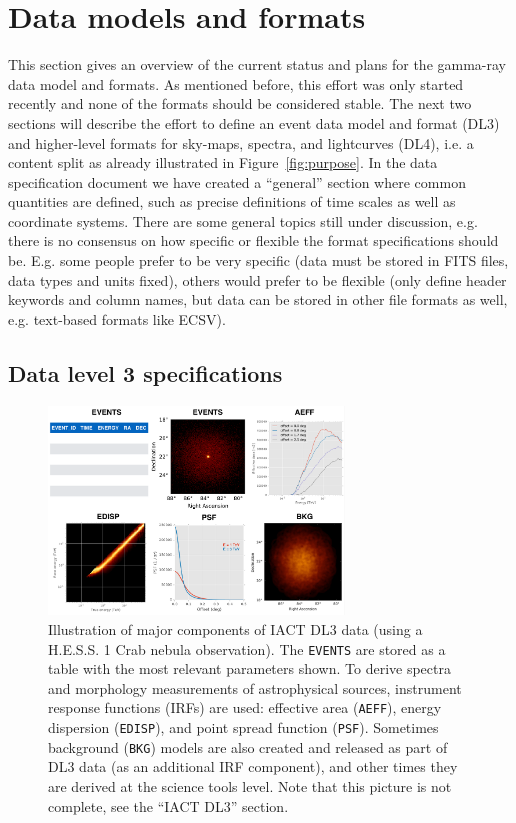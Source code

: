 \section{Data models and formats}

This section gives an overview of the current status and plans for the gamma-ray data model and formats. As mentioned before, this effort was only started recently and none of the formats should be considered stable. The next two sections will describe the effort to define an event data model and format (DL3) and higher-level formats for sky-maps, spectra, and lightcurves (DL4), i.e. a content split as already illustrated in Figure~\ref{fig:purpose}.
In the data specification document we have created a ``general'' section where common quantities are defined, such as precise definitions of time scales as well as coordinate systems. 
%
There are some general topics still under discussion, e.g. there is no consensus on how specific or flexible the format specifications should be. E.g. some people prefer to be very specific (data must be stored in FITS files, data types and units fixed), others would prefer to be flexible (only define header keywords and column names, but data can be stored in other file formats as well, e.g. text-based formats like ECSV).

\subsection{Data level 3 specifications}

\begin{figure}[tb]
\centerline{\includegraphics[width=0.7\textwidth]{figures/iact-dl3}}
\caption{
Illustration of major components of IACT DL3 data (using a H.E.S.S. 1 Crab nebula observation). The \texttt{EVENTS} are stored as a table with the most relevant parameters shown. To derive spectra and morphology measurements of astrophysical sources, instrument response functions (IRFs) are used: effective area (\texttt{AEFF}), energy dispersion (\texttt{EDISP}), and point spread function (\texttt{PSF}). Sometimes background (\texttt{BKG}) models are also created and released as part of DL3 data (as an additional IRF component), and other times they are derived at the science tools level. Note that this picture is not complete, see the ``IACT DL3'' section.
}
\label{fig:iact-dl3}
\end{figure}

